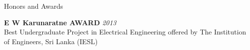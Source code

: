 \documentclass[
11pt, %
]{./assets/resume} %
\begin{document}
	



 



\begin{rSection}{Honors and Awards}

	\textbf{E W Karunaratne AWARD} \hfill \textit{2013}\\
	Best Undergraduate Project in Electrical Engineering offered by The Institution of Engineers, Sri Lanka (IESL)

\end{rSection}
\end{document}
